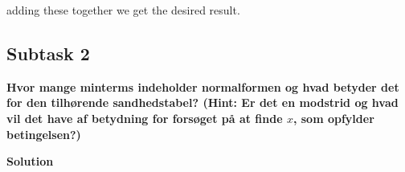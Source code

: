 adding these together we get the desired result.

\subsection{Subtask 2}
\noindent
\textbf{Hvor mange minterms indeholder normalformen og hvad betyder det for den tilhørende sandhedstabel? (Hint: Er det en modstrid og hvad vil det have af betydning for forsøget på at finde $x$, som opfylder betingelsen?)}

\bigskip
\noindent
\textbf{Solution}

